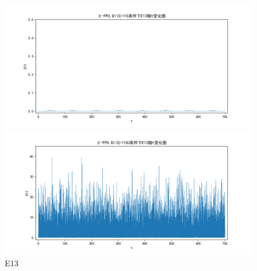 \documentclass[10pt, a4paper]{article}
\begin{document}
    \begin{figure}[H]
        \begin{minipage}[t]{0.49\textwidth}
            \centering
            \includegraphics[width=\textwidth]{./q6_pics/cmp/E13.png}
        \end{minipage}
        \begin{minipage}[t]{0.49\textwidth}
            \centering
            \includegraphics[width=\textwidth]{./q6_pics/exp/E13.png}
        \end{minipage}
        \caption{E13}\label{fig:E13 in q6}
    \end{figure}
\end{document}
